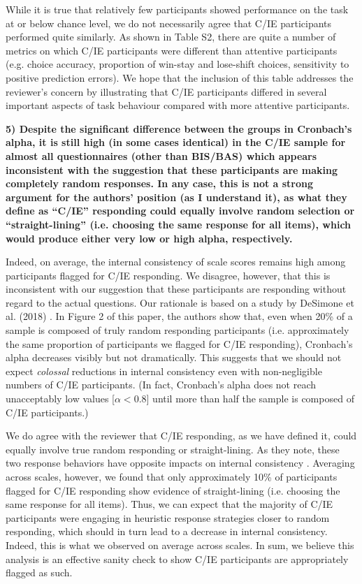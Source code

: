 \documentclass[a4paper,notitlepage,12pt]{article}
\begin{document}
While it is true that relatively few participants showed performance on the task at or below chance level, we do not necessarily agree that C/IE participants performed quite similarly. As shown in Table S2, there are quite a number of metrics on which C/IE participants were different than attentive participants (e.g. choice accuracy, proportion of win-stay and lose-shift choices, sensitivity to positive prediction errors). We hope that the inclusion of this table addresses the reviewer's concern by illustrating that C/IE participants differed in several important aspects of task behaviour compared with more attentive participants.

\textbf{5) Despite the significant difference between the groups in Cronbach's alpha, it is still high (in some cases identical) in the C/IE sample for almost all questionnaires (other than BIS/BAS) which appears inconsistent with the suggestion that these participants are making completely random responses. In any case, this is not a strong argument for the authors' position (as I understand it), as what they define as ``C/IE'' responding could equally involve random selection or ``straight-lining'' (i.e. choosing the same response for all items), which would produce either very low or high alpha, respectively.}

Indeed, on average, the internal consistency of scale scores remains high among participants flagged for C/IE responding. We disagree, however, that this is inconsistent with our suggestion that these participants are responding without regard to the actual questions. Our rationale is based on a study by DeSimone et al. (2018) \cite{desimone2018differential}. In Figure 2 of this paper, the authors show that, even when 20\% of a sample is composed of truly random responding participants (i.e. approximately the same proportion of participants we flagged for C/IE responding), Cronbach's alpha decreases visibly but not dramatically. This suggests that we should not expect \textit{colossal} reductions in internal consistency even with non-negligible numbers of C/IE participants. (In fact, Cronbach's alpha does not reach unacceptably low values [$\alpha < 0.8$] until more than half the sample is composed of C/IE participants.)  

We do agree with the reviewer that C/IE responding, as we have defined it, could equally involve true random responding or straight-lining. As they note, these two response behaviors have opposite impacts on internal consistency \cite{desimone2018differential}. Averaging across scales, however, we found that only approximately 10\% of participants flagged for C/IE responding show evidence of straight-lining (i.e. choosing the same response for all items). Thus, we can expect that the majority of C/IE participants were engaging in heuristic response strategies closer to random responding, which should in turn lead to a decrease in internal consistency. Indeed, this is what we observed on average across scales. In sum, we believe this analysis is an effective sanity check to show C/IE participants are appropriately flagged as such.
\end{document}
